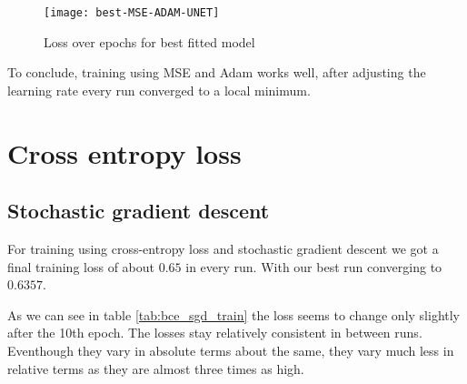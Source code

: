 \begin{figure}[h]
    \texttt{[image: best-MSE-ADAM-UNET]}
    \caption{\label{im:best-MSE-ADAM-UNET} Loss over epochs for best fitted model}
\end{figure}

To conclude, training using MSE and Adam works well, after adjusting the learning rate every run converged 
to a local minimum.

\section{Cross entropy loss}
\subsection{Stochastic gradient descent}
 For training using cross-entropy loss and stochastic gradient descent we got a final training loss
 of about $0.65$ in every run. With our best run converging to $0.6357$. 

 As we can see in table \ref{tab:bce_sgd_train} the loss seems to change only slightly after the 10th epoch.
 The losses stay relatively consistent in between runs. Eventhough they vary in absolute terms about the same,
 they vary much less in relative terms as they are almost three times as high.

 

